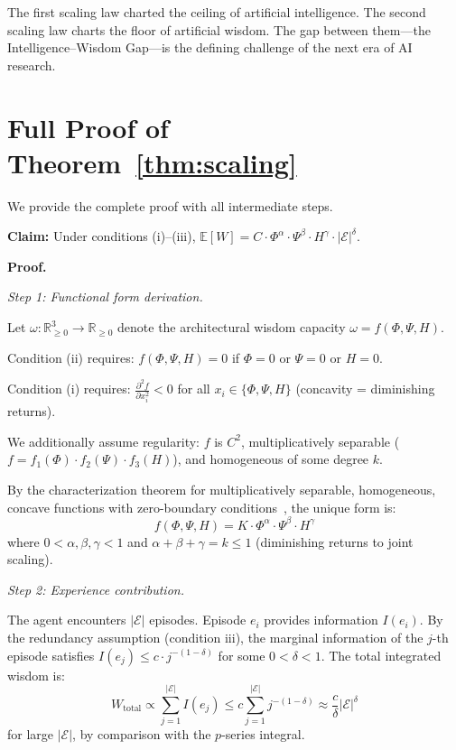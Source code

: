 \documentclass{article}
\newcommand{\cE}{\mathcal{E}}
\newcommand{\R}{\mathbb{R}}
\newcommand{\E}{\mathbb{E}}
\begin{document}
The first scaling law charted the ceiling of artificial intelligence.
The second scaling law charts the floor of artificial wisdom.
The gap between them---the Intelligence--Wisdom Gap---is the defining challenge of the next era of AI research.




\appendix

\section{Full Proof of Theorem~\ref{thm:scaling}}
\label{app:proof}

We provide the complete proof with all intermediate steps.

\textbf{Claim:} Under conditions (i)--(iii), $\E[W] = C \cdot \Phi^\alpha \cdot \Psi^\beta \cdot H^\gamma \cdot |\cE|^\delta$.

\textbf{Proof.}

\emph{Step 1: Functional form derivation.}

Let $\omega: \R_{\geq 0}^3 \to \R_{\geq 0}$ denote the architectural wisdom capacity $\omega = f(\Phi, \Psi, H)$.

Condition (ii) requires: $f(\Phi, \Psi, H) = 0$ if $\Phi = 0$ or $\Psi = 0$ or $H = 0$.

Condition (i) requires: $\frac{\partial^2 f}{\partial x_i^2} < 0$ for all $x_i \in \{\Phi, \Psi, H\}$ (concavity = diminishing returns).

We additionally assume regularity: $f$ is $C^2$, multiplicatively separable ($f = f_1(\Phi) \cdot f_2(\Psi) \cdot f_3(H)$), and homogeneous of some degree $k$.

By the characterization theorem for multiplicatively separable, homogeneous, concave functions with zero-boundary conditions~\citep{mishra2007brief}, the unique form is:
\[
    f(\Phi, \Psi, H) = K \cdot \Phi^\alpha \cdot \Psi^\beta \cdot H^\gamma
\]
where $0 < \alpha, \beta, \gamma < 1$ and $\alpha + \beta + \gamma = k \leq 1$ (diminishing returns to joint scaling).

\emph{Step 2: Experience contribution.}

The agent encounters $|\cE|$ episodes.  Episode $e_i$ provides information $I(e_i)$.
By the redundancy assumption (condition iii), the marginal information of the $j$-th episode satisfies $I(e_j) \leq c \cdot j^{-(1-\delta)}$ for some $0 < \delta < 1$.
The total integrated wisdom is:
\[
    W_{\text{total}} \propto \sum_{j=1}^{|\cE|} I(e_j) \leq c \sum_{j=1}^{|\cE|} j^{-(1-\delta)} \approx \frac{c}{\delta} |\cE|^\delta
\]
for large $|\cE|$, by comparison with the $p$-series integral.
\end{document}
